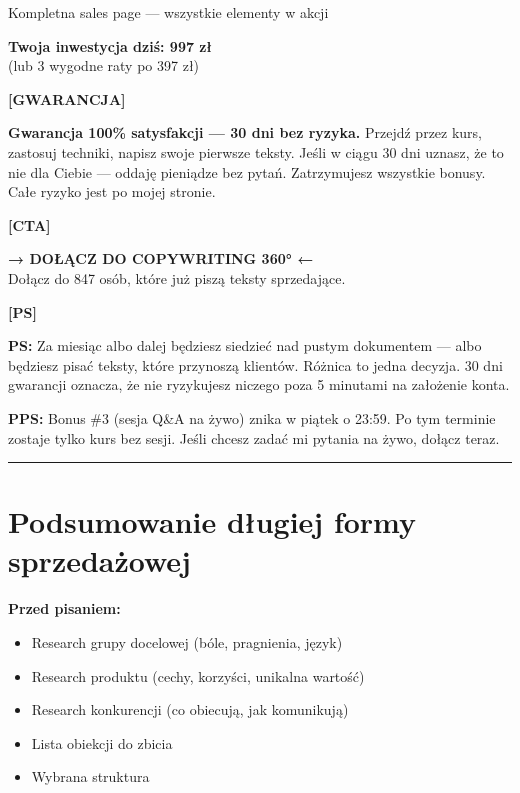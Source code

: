 \documentclass[
  12pt,
  a4paper,
  twoside,
  openright,
  12pt,
  DIV=12,
  BCOR=12mm]{scrbook}
\providecommand{\tightlist}{%
  \setlength{\itemsep}{0pt}\setlength{\parskip}{0pt}}\usepackage{longtable,booktabs,array}
\newcommand{\decoline}{%
  \begin{center}
    \textcolor{bordergray}{\rule{0.3\textwidth}{0.5pt}}
  \end{center}
}
\begin{document}
\begin{przyklad}{Kompletna sales page --- wszystkie elementy w akcji}
\begin{center}
\Large\textbf{Twoja inwestycja dziś: 997 zł}\\[2pt]
\normalsize(lub 3 wygodne raty po 397 zł)
\end{center}

\bigskip
\textbf{[GWARANCJA]}

\textbf{Gwarancja 100\% satysfakcji --- 30 dni bez ryzyka.} Przejdź przez kurs, zastosuj techniki, napisz swoje pierwsze teksty. Jeśli w ciągu 30 dni uznasz, że to nie dla Ciebie --- oddaję pieniądze bez pytań. Zatrzymujesz wszystkie bonusy. Całe ryzyko jest po mojej stronie.

\bigskip
\textbf{[CTA]}

\begin{center}
\textbf{→ DOŁĄCZ DO COPYWRITING 360° ←}\\[2pt]
{\small Dołącz do 847 osób, które już piszą teksty sprzedające.}
\end{center}

\bigskip
\textbf{[PS]}

\textbf{PS:} Za miesiąc albo dalej będziesz siedzieć nad pustym dokumentem --- albo będziesz pisać teksty, które przynoszą klientów. Różnica to jedna decyzja. 30 dni gwarancji oznacza, że nie ryzykujesz niczego poza 5 minutami na założenie konta.

\textbf{PPS:} Bonus \#3 (sesja Q\&A na żywo) znika w piątek o 23:59. Po tym terminie zostaje tylko kurs bez sesji. Jeśli chcesz zadać mi pytania na żywo, dołącz teraz.
\end{przyklad}

\decoline

\section{Podsumowanie długiej formy
sprzedażowej}\label{podsumowanie-dux142ugiej-formy-sprzedaux17cowej}

\textbf{Przed pisaniem:}

\begin{itemize}
\tightlist
\item[$\square$]
  Research grupy docelowej (bóle, pragnienia, język)
\item[$\square$]
  Research produktu (cechy, korzyści, unikalna wartość)
\item[$\square$]
  Research konkurencji (co obiecują, jak komunikują)
\item[$\square$]
  Lista obiekcji do zbicia
\item[$\square$]
  Wybrana struktura
\end{itemize}
\end{document}

